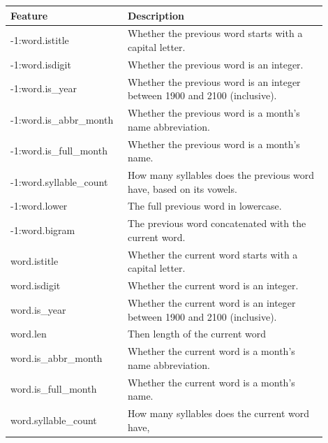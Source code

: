   \begin{table}[ht]
    \centering
    \begin{tabular}{|p{0.3\linewidth}|p{0.6\linewidth}|}
      \hline
      \textbf{Feature} & \textbf{Description} \\
      \hline
      \rowcolor{dark_blue}
      -1:word.istitle & Whether the previous word starts with a capital letter.
      \\
      \hline
      \rowcolor{dark_blue}
      -1:word.isdigit & Whether the previous word is an integer. \\
      \hline
      \rowcolor{dark_blue}
      -1:word.is\_year & Whether the previous word is an integer between 1900
      and 2100 (inclusive). \\
      \hline
      \rowcolor{dark_blue}
      -1:word.is\_abbr\_month & Whether the previous word is a month's name
      abbreviation. \\
      \hline
      \rowcolor{dark_blue}
      -1:word.is\_full\_month & Whether the previous word is a month's name. \\
      \hline
      \rowcolor{dark_blue}
      -1:word.syllable\_count & How many syllables does the previous word have,
      based on its vowels. \\
      \hline
      \rowcolor{dark_blue}
      -1:word.lower & The full previous word in lowercase. \\
      \hline
      \rowcolor{dark_blue}
      -1:word.bigram & The previous word concatenated with the current word. \\
      \hline
      \rowcolor{blue}
      word.istitle & Whether the current word starts with a capital letter. \\
      \hline
      \rowcolor{blue}
      word.isdigit & Whether the current word is an integer.\\
      \hline
      \rowcolor{blue}
      word.is\_year & Whether the current word is an integer between 1900
      and 2100 (inclusive). \\
      \hline
      \rowcolor{blue}
      word.len & Then length of the current word \\
      \hline
      \rowcolor{blue}
      word.is\_abbr\_month & Whether the current word is a month's name
      abbreviation. \\
      \hline
      \rowcolor{blue}
      word.is\_full\_month & Whether the current word is a month's name. \\
      \hline
      \rowcolor{blue}
      word.syllable\_count & How many syllables does the current word have,

\end{tabular}
\end{table}
